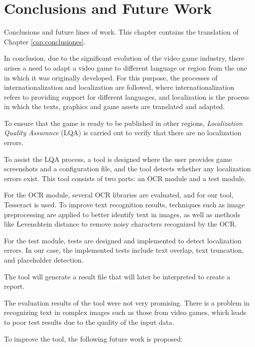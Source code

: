 \chapter*{Conclusions and Future Work}
\label{cap:conclusions}

Conclusions and future lines of work. This chapter contains the translation of Chapter \ref{cap:conclusiones}.

In conclusion, due to the significant evolution of the video game industry, there arises a need to adapt a video game to different language or region from the one in which it was originally developed. For this purpose, the processes of internationalization and localization are followed, where internationalization refers to providing support for different languages, and localization is the process in which the texts, graphics and game assets are translated and adapted.

To ensure that the game is ready to be published in other regions, \textit{Localization Quality Assurance} (LQA) is carried out to verify that there are no localization errors.

To assist the LQA process, a tool is designed where the user provides game screenshots and a configuration file, and the tool detects whether any localization errors exist. This tool consists of two parts: an OCR module and a test module.

For the OCR module, several OCR libraries are evaluated, and for our tool, Tesseract is used. To improve text recognition results, techniques such as image preprocessing are applied to better identify text in images, as well as methods like Levenshtein distance to remove noisy characters recognized by the OCR.

For the test module, tests are designed and implemented to detect localization errors. In our case, the implemented tests include text overlap, text truncation, and placeholder detection.

The tool will generate a result file that will later be interpreted to create a report.

The evaluation results of the tool were not very promising. There is a problem in recognizing text in complex images such as those from video games, which leads to poor test results due to the quality of the input data.

To improve the tool, the following future work is proposed:


